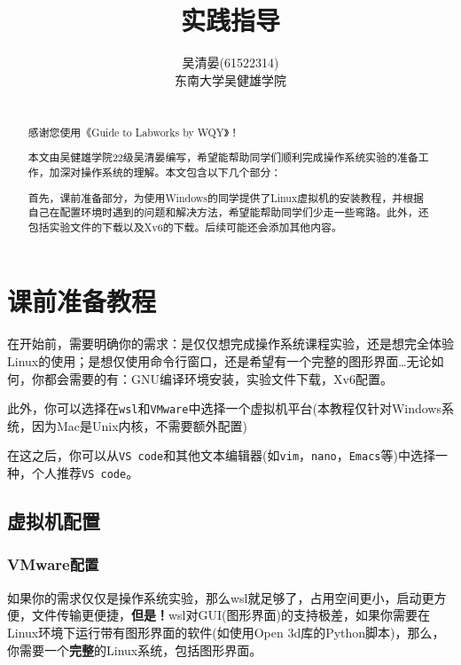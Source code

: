 \documentclass[
]{article}
\title{实践指导}
\author{吴清晏(61522314) \\ 东南大学吴健雄学院}
\date{}
\begin{document}
\maketitle

\newpage
\renewcommand{\abstractname}{\LARGE\textbf{前言}}
\begin{abstract}\large
	~\\
	感谢您使用《Guide to Labworks by WQY》！

	本文由吴健雄学院22级吴清晏编写，希望能帮助同学们顺利完成操作系统实验的准备工作，加深对操作系统的理解。本文包含以下几个部分：

	首先，课前准备部分，为使用Windows的同学提供了Linux虚拟机的安装教程，并根据自己在配置环境时遇到的问题和解决方法，希望能帮助同学们少走一些弯路。此外，还包括实验文件的下载以及Xv6的下载。后续可能还会添加其他内容。

\end{abstract}

\newpage
\begin{center}
	\tableofcontents
\end{center}
\newpage

\section{课前准备教程}\label{ux8bfeux524dux51c6ux5907ux6559ux7a0b}

在开始前，需要明确你的需求：是仅仅想完成操作系统课程实验，还是想完全体验Linux的使用；是想仅使用命令行窗口，还是希望有一个完整的图形界面\ldots 无论如何，你都会需要的有：GNU编译环境安装，实验文件下载，Xv6配置。

此外，你可以选择在\texttt{wsl}和\texttt{VMware}中选择一个虚拟机平台(本教程仅针对Windows系统，因为Mac是Unix内核，不需要额外配置)

在这之后，你可以从\texttt{VS\ code}和其他文本编辑器(如\texttt{vim}，\texttt{nano}，\texttt{Emacs}等)中选择一种，个人推荐\texttt{VS\ code}。

\subsection{虚拟机配置}\label{ux865aux62dfux673aux914dux7f6e}

\subsubsection{VMware配置}\label{vmwareux914dux7f6e}

如果你的需求仅仅是操作系统实验，那么wsl就足够了，占用空间更小，启动更方便，文件传输更便捷，\textbf{但是！}wsl对GUI(图形界面)的支持极差，如果你需要在Linux环境下运行带有图形界面的软件(如使用Open
3d库的Python脚本)，那么，你需要一个\textbf{完整}的Linux系统，包括图形界面。
\end{document}
